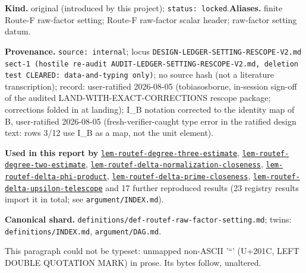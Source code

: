 \begin{defnote}
\textbf{Kind.} original (introduced by this project); \texttt{status: locked}.\quad\textbf{Aliases.} finite Route-F raw-factor setting; Route-F raw-factor scalar header; raw-factor setting datum.
\par
\textbf{Provenance.} \texttt{source: internal}; locus \texttt{DESIGN-\allowbreak{}LEDGER-\allowbreak{}SETTING-\allowbreak{}RESCOPE-\allowbreak{}V2.\allowbreak{}md sect-\allowbreak{}1 (hostile re-\allowbreak{}audit AUDIT-\allowbreak{}LEDGER-\allowbreak{}SETTING-\allowbreak{}RESCOPE-\allowbreak{}V2.\allowbreak{}md,\allowbreak{} deletion test CLEARED:\allowbreak{} data-\allowbreak{}and-\allowbreak{}typing only)}; no source hash (not a literature transcription); record: user-\allowbreak{}ratified 2026-\allowbreak{}08-\allowbreak{}05 (tobiasosborne,\allowbreak{} in-\allowbreak{}session sign-\allowbreak{}off of the audited LAND-\allowbreak{}WITH-\allowbreak{}EXACT-\allowbreak{}CORRECTIONS rescope package;\allowbreak{} corrections folded in at landing);\allowbreak{} I\_B notation corrected to the identity map of B,\allowbreak{} user-\allowbreak{}ratified 2026-\allowbreak{}08-\allowbreak{}05 (fresh-\allowbreak{}verifier-\allowbreak{}caught type error in the ratified design text:\allowbreak{} rows 3/\allowbreak{}12 use I\_B as a map,\allowbreak{} not the unit element).
\par
\textbf{Used in this report by} \hyperref[lem:routef-degree-three-estimate]{\texttt{lem-\allowbreak{}routef-\allowbreak{}degree-\allowbreak{}three-\allowbreak{}estimate}}, \hyperref[lem:routef-degree-two-estimate]{\texttt{lem-\allowbreak{}routef-\allowbreak{}degree-\allowbreak{}two-\allowbreak{}estimate}}, \hyperref[lem:routef-delta-normalization-closeness]{\texttt{lem-\allowbreak{}routef-\allowbreak{}delta-\allowbreak{}normalization-\allowbreak{}closeness}}, \hyperref[lem:routef-delta-phi-product]{\texttt{lem-\allowbreak{}routef-\allowbreak{}delta-\allowbreak{}phi-\allowbreak{}product}}, \hyperref[lem:routef-delta-prime-closeness]{\texttt{lem-\allowbreak{}routef-\allowbreak{}delta-\allowbreak{}prime-\allowbreak{}closeness}}, \hyperref[lem:routef-delta-upsilon-telescope]{\texttt{lem-\allowbreak{}routef-\allowbreak{}delta-\allowbreak{}upsilon-\allowbreak{}telescope}} and 17 further reproduced results (23 registry results import it in total; see \texttt{argument/INDEX.md}).
\par
\textbf{Canonical shard.} \texttt{definitions/\allowbreak{}def-\allowbreak{}routef-\allowbreak{}raw-\allowbreak{}factor-\allowbreak{}setting.\allowbreak{}md}; twins: \texttt{definitions/INDEX.md}, \texttt{argument/DAG.md}.
\par
\begin{defflag}
This paragraph could not be typeset: unmapped non-ASCII '“' (U+201C, LEFT DOUBLE QUOTATION MARK) in prose. Its bytes follow, unaltered.
\end{defflag}


\end{defnote}
